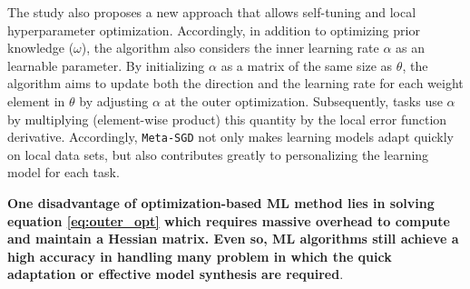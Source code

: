 The \cite{li2017meta} study also proposes a new approach that allows self-tuning and local hyperparameter optimization. Accordingly, in addition to optimizing prior knowledge ($\omega$), the algorithm also considers the inner learning rate $\alpha$ as an learnable parameter. By initializing $\alpha$ as a matrix of the same size as $\theta$, the algorithm aims to update both the direction and the learning rate for each weight element in $\theta$ by adjusting $\alpha$ at the outer optimization. Subsequently, tasks use $\alpha$ by multiplying (element-wise product) this quantity by the local error function derivative. Accordingly, \verb|Meta-SGD| not only makes learning models adapt quickly on local data sets, but also contributes greatly to personalizing the learning model for each task.

\textbf{One disadvantage of optimization-based ML method lies in solving equation \ref{eq:outer_opt} which requires massive overhead to compute and maintain a Hessian matrix. Even so, ML algorithms still achieve a high accuracy in handling many problem in which the quick adaptation or effective model synthesis are required}.
